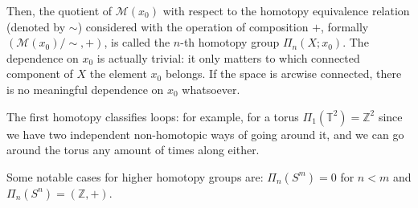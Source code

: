\documentclass[main.tex]{subfiles}
\begin{document}
Then, the quotient of $\mathcal M(x_0)$ with respect to the homotopy equivalence relation (denoted by $\sim$) considered with the operation of composition $+$, formally $(\mathcal{M}(x_0)/\sim, +)$,
is called the \(n\)-th homotopy group \(\Pi_n (X; x_0)\).
The dependence on \(x_0\) is actually trivial: it only matters to which connected component of \(X\) the element \(x_0\) belongs. If the space is arcwise connected, there is no meaningful dependence on \(x_0 \) whatsoever.


The first homotopy classifies loops: for example, for a torus \(\Pi_{1} (\mathbb{T}^2) = \mathbb{Z}^2\) since we have two independent non-homotopic  ways of going around it, and we can go around the torus any amount of times along either.

Some notable cases for higher homotopy groups are: \(\Pi_n (S^m) = 0 \) for \(n<m\) and \(\Pi_n (S^n) = (\mathbb Z, +)\).
\end{document}
